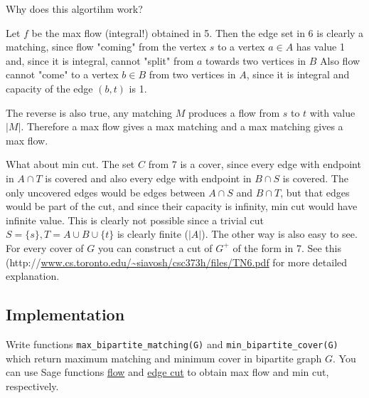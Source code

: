 \medskip
\noindent Why does this algortihm work?

\medskip
Let $f$ be the max flow (integral!) obtained in 5. Then the edge set in 6 is clearly a matching, since flow "coming" from the vertex $s$ to a vertex $a \in A$ has value 1 and, since it is integral, cannot "split" from $a$ towards two vertices in $B$ Also flow cannot "come" to a vertex $b \in B$ from two vertices in $A$, since it is integral and capacity of the edge $(b, t)$ is 1.

The reverse is also true, any matching $M$ produces a flow from $s$ to $t$ with value $|M|$. Therefore a max flow gives a max matching and a max matching gives a max flow.

What about min cut. The set $C$ from 7 is a cover, since every edge with endpoint in $A \cap T$ is covered and also every edge with endpoint in $B \cap S$ is covered. The only uncovered edges would be edges between $A \cap S$ and $B \cap T$, but that edges would be part of the cut, and since their capacity is infinity, min cut would have infinite value. This is clearly not possible since a trivial cut $S = \{s\}, T = A \cup B \cup \{t\}$ is clearly finite ($|A|$). The other way is also easy to see. For every cover of $G$ you can construct a cut of $G^+$ of the form in 7. See this (http://\url{www.cs.toronto.edu/~siavosh/csc373h/files/TN6.pdf} for more detailed explanation.

\subsection{Implementation}

Write functions \verb`max_bipartite_matching(G)` and \verb`min_bipartite_cover(G)` which return maximum matching and minimum cover in bipartite graph $G$. You can use Sage functions \href{http://doc.sagemath.org/html/en/reference/graphs/sage/graphs/generic_graph.html#sage.graphs.generic_graph.GenericGraph.flow}{flow} and \href{http://doc.sagemath.org/html/en/reference/graphs/sage/graphs/generic_graph.html#sage.graphs.generic_graph.GenericGraph.edge_cut}{edge cut} to obtain max flow and min cut, respectively.

